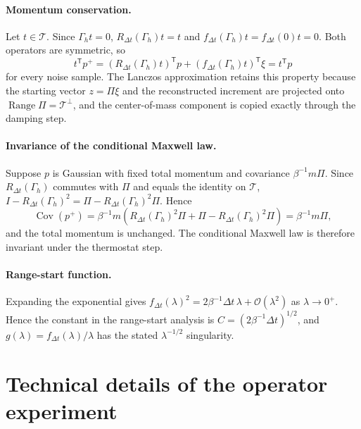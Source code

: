 \documentclass[11pt]{article}
\theoremstyle{plain}
\newcommand{\cT}{\mathcal{T}}
\newcommand{\Range}{\operatorname{Range}}
\DeclareRobustCommand{\_}{\textunderscore\allowbreak}
\begin{document}
\paragraph{Momentum conservation.}
Let $t\in\cT$. Since $\Gamma_h t=0$, $R_{\Delta t}(\Gamma_h)t=t$ and
$f_{\Delta t}(\Gamma_h)t=f_{\Delta t}(0)t=0$. Both operators are symmetric,
so
\begin{equation}
t^{\mathsf T}p^{+}
=
\left(R_{\Delta t}(\Gamma_h)t\right)^{\mathsf T}p
+
\left(f_{\Delta t}(\Gamma_h)t\right)^{\mathsf T}\xi
=
t^{\mathsf T}p
\end{equation}
for every noise sample. The Lanczos approximation retains this property
because the starting vector $z=\Pi\xi$ and the reconstructed increment are
projected onto $\Range\Pi=\cT^\perp$, and the center-of-mass component is
copied exactly through the damping step.

\paragraph{Invariance of the conditional Maxwell law.}
Suppose $p$ is Gaussian with fixed total momentum and covariance
$\beta^{-1}m\Pi$. Since $R_{\Delta t}(\Gamma_h)$ commutes with $\Pi$ and
equals the identity on $\cT$, $I-R_{\Delta t}(\Gamma_h)^2
=\Pi-R_{\Delta t}(\Gamma_h)^2\Pi$. Hence
\begin{equation}
\operatorname{Cov}(p^{+})
=
\beta^{-1}m
\left(
R_{\Delta t}(\Gamma_h)^2\Pi
+
\Pi-R_{\Delta t}(\Gamma_h)^2\Pi
\right)
=
\beta^{-1}m\Pi,
\end{equation}
and the total momentum is unchanged. The conditional Maxwell law is
therefore invariant under the thermostat step.

\paragraph{Range-start function.}
Expanding the exponential gives
$f_{\Delta t}(\lambda)^2=2\beta^{-1}\Delta t\,\lambda+\mathcal{O}(\lambda^2)$
as $\lambda\to0^+$. Hence the constant in the range-start analysis is
$C=(2\beta^{-1}\Delta t)^{1/2}$, and $g(\lambda)=f_{\Delta t}(\lambda)/\lambda$
has the stated $\lambda^{-1/2}$ singularity.

\section{Technical details of the operator experiment}
\label{app:exp-details}
\end{document}
